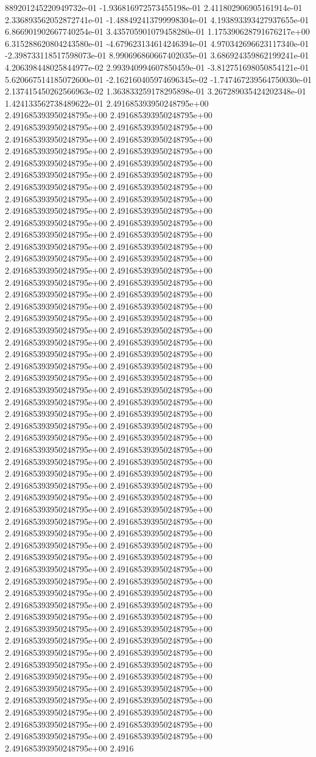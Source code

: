 889201245220949732e-01	-1.936816972573455198e-01	2.411802906905161914e-01	2.336893562052872741e-01	-1.488492413799998304e-01	4.193893393427937655e-01	6.866901902667740254e-01	3.435705901079458280e-01	1.175390628791676217e+00	6.315288620804243580e-01	-4.679623134614246394e-01	4.970342696623117340e-01	-2.398733118517598073e-01	8.990696860667402035e-01	3.686924359862199241e-01	4.206398448025844977e-02	2.993940994607850459e-01	-3.812751698050854121e-01	5.620667514185072600e-01	-2.162160405974696345e-02	-1.747467239564750030e-01	2.137415450262566963e-02	1.363833259178295898e-01	3.267289035424202348e-01	1.424133562738489622e-01
2.491685393950248795e+00	2.491685393950248795e+00	2.491685393950248795e+00	2.491685393950248795e+00	2.491685393950248795e+00	2.491685393950248795e+00	2.491685393950248795e+00	2.491685393950248795e+00	2.491685393950248795e+00	2.491685393950248795e+00	2.491685393950248795e+00	2.491685393950248795e+00	2.491685393950248795e+00	2.491685393950248795e+00	2.491685393950248795e+00	2.491685393950248795e+00	2.491685393950248795e+00	2.491685393950248795e+00	2.491685393950248795e+00	2.491685393950248795e+00	2.491685393950248795e+00	2.491685393950248795e+00	2.491685393950248795e+00	2.491685393950248795e+00	2.491685393950248795e+00	2.491685393950248795e+00	2.491685393950248795e+00	2.491685393950248795e+00	2.491685393950248795e+00	2.491685393950248795e+00	2.491685393950248795e+00	2.491685393950248795e+00	2.491685393950248795e+00	2.491685393950248795e+00	2.491685393950248795e+00	2.491685393950248795e+00	2.491685393950248795e+00	2.491685393950248795e+00	2.491685393950248795e+00	2.491685393950248795e+00	2.491685393950248795e+00	2.491685393950248795e+00	2.491685393950248795e+00	2.491685393950248795e+00	2.491685393950248795e+00	2.491685393950248795e+00	2.491685393950248795e+00	2.491685393950248795e+00	2.491685393950248795e+00	2.491685393950248795e+00	2.491685393950248795e+00	2.491685393950248795e+00	2.491685393950248795e+00	2.491685393950248795e+00	2.491685393950248795e+00	2.491685393950248795e+00	2.491685393950248795e+00	2.491685393950248795e+00	2.491685393950248795e+00	2.491685393950248795e+00	2.491685393950248795e+00	2.491685393950248795e+00	2.491685393950248795e+00	2.491685393950248795e+00	2.491685393950248795e+00	2.491685393950248795e+00	2.491685393950248795e+00	2.491685393950248795e+00	2.491685393950248795e+00	2.491685393950248795e+00	2.491685393950248795e+00	2.491685393950248795e+00	2.491685393950248795e+00	2.491685393950248795e+00	2.491685393950248795e+00	2.491685393950248795e+00	2.491685393950248795e+00	2.491685393950248795e+00	2.491685393950248795e+00	2.491685393950248795e+00	2.491685393950248795e+00	2.491685393950248795e+00	2.491685393950248795e+00	2.491685393950248795e+00	2.491685393950248795e+00	2.491685393950248795e+00	2.491685393950248795e+00	2.491685393950248795e+00	2.491685393950248795e+00	2.491685393950248795e+00	2.491685393950248795e+00	2.491685393950248795e+00	2.491685393950248795e+00	2.491685393950248795e+00	2.491685393950248795e+00	2.491685393950248795e+00	2.491685393950248795e+00	2.491685393950248795e+00	2.491685393950248795e+00	2.491685393950248795e+00	2.491685393950248795e+00	2.491685393950248795e+00	2.491685393950248795e+00	2.491685393950248795e+00	2.491685393950248795e+00	2.491685393950248795e+00	2.491685393950248795e+00	2.491685393950248795e+00	2.4916